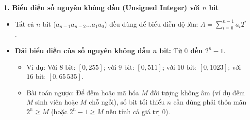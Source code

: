 \textbf{1. Biểu diễn số nguyên không dấu (Unsigned Integer) với $n$ bit}
\begin{itemize}
    \item Tất cả $n$ bit ($a_{n-1}a_{n-2}\dots a_1a_0$) đều dùng để biểu diễn độ lớn: $A = \sum_{i=0}^{n-1} a_i 2^i$.
    \item \textbf{Dải biểu diễn của số nguyên không dấu $n$ bit:} Từ \textbf{$0$ đến $2^n - 1$}.
    \begin{itemize}
        \item Ví dụ: Với $8\text{ bit}$: $[0, 255]$; với $9\text{ bit}$: $[0, 511]$; với $10\text{ bit}$: $[0, 1023]$; với $16\text{ bit}$: $[0, 65\,535]$.
        \item Bài toán ngược: Để đếm hoặc mã hóa $M$ đối tượng không âm (ví dụ đếm $M$ sinh viên hoặc $M$ chỗ ngồi), số bit tối thiểu $n$ cần dùng phải thỏa mãn $2^n \ge M$ (hoặc $2^n - 1 \ge M$ nếu tính cả giá trị $0$).
    \end{itemize}
\end{itemize}

